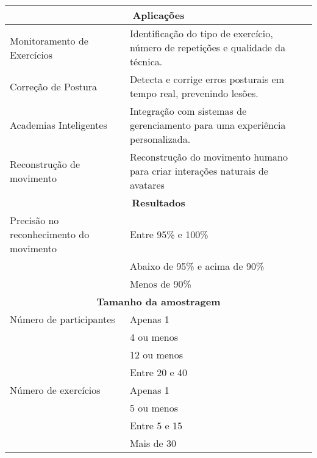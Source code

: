\documentclass[conference]{IEEEtran}
\begin{document}
\begin{table*}
\begin{tabularx}{\textwidth}{|p{3cm}|X|p{3cm}|}
    \multicolumn{3}{|c|}{\textbf{Aplicações}} \\ \hline
    Monitoramento de Exercícios & Identificação do tipo de exercício, número de repetições e qualidade da técnica. & \cite{Tian2021, colpitts2023kinematics, Mekruksavanich2024, Asghar2023, Bian2022, Ceccarelli2024, Kwon2021, Hussain2022} \\ \hline
    Correção de Postura & Detecta e corrige erros posturais em tempo real, prevenindo lesões. & \cite{papadopoulou2023towards, Michaud2021} \\ \hline
    Academias Inteligentes & Integração com sistemas de gerenciamento para uma experiência personalizada. & \cite{Islam2021} \\ \hline
    Reconstrução de movimento & Reconstrução do movimento humano para criar interações naturais de avatares & \cite{Ponton2023} \\ \hline

    \multicolumn{3}{|c|}{\textbf{Resultados}} \\ \hline
    Precisão no reconhecimento do movimento & Entre 95\% e 100\% & \cite{Tian2021, Mekruksavanich2024} \\ \cline{2-3}
     & Abaixo de 95\% e acima de 90\% & \cite{papadopoulou2023towards, Asghar2023, Bian2022} \\ \cline{2-3}
     & Menos de 90\% & \cite{Kwon2021, Hussain2022} \\ \hline

    \multicolumn{3}{|c|}{\textbf{Tamanho da amostragem}} \\ \hline
    Número de participantes & Apenas 1 & \cite{colpitts2023kinematics, Ceccarelli2024} \\ \cline{2-3}
     & 4 ou menos & \cite{Hussain2022} \\ \cline{2-3}
     & 12 ou menos& \cite{Tian2021, papadopoulou2023towards, Mekruksavanich2024, Bian2022, Ponton2023} \\ \cline{2-3}
     & Entre 20 e 40 & \cite{Islam2021, Michaud2021} \\ \hline
  
    Número de exercícios & Apenas 1 & \cite{Ceccarelli2024} \\ \cline{2-3}
     & 5 ou menos & \cite{Ponton2023, colpitts2023kinematics, Michaud2021, papadopoulou2023towards} \\ \cline{2-3}
     & Entre 5 e 15 & \cite{Tian2021, Bian2022, Kwon2021} \\ \cline{2-3}
     & Mais de 30 & \cite{Mekruksavanich2024, Hussain2022} \\ \hline


\end{tabularx}
\end{table*}
\end{document}
